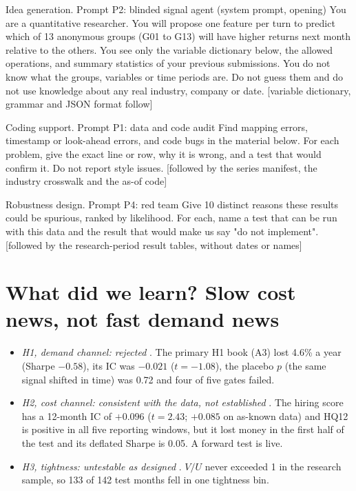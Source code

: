 \begin{promptbox}{Idea generation. Prompt P2: blinded signal agent (system prompt, opening)}
You are a quantitative researcher. You will propose one feature per turn to predict which of 13 anonymous groups (G01 to G13) will have higher returns next month relative to the others. You see only the variable dictionary below, the allowed operations, and summary statistics of your previous submissions. You do not know what the groups, variables or time periods are. Do not guess them and do not use knowledge about any real industry, company or date. [variable dictionary, grammar and JSON format follow]
\end{promptbox}
\begin{promptbox}{Coding support. Prompt P1: data and code audit}
Find mapping errors, timestamp or look-ahead errors, and code bugs in the material below. For each problem, give the exact line or row, why it is wrong, and a test that would confirm it. Do not report style issues. [followed by the series manifest, the industry crosswalk and the as-of code]
\end{promptbox}
\begin{promptbox}{Robustness design. Prompt P4: red team}\label{box:p4}
Give 10 distinct reasons these results could be spurious, ranked by likelihood. For each, name a test that can be run with this data and the result that would make us say "do not implement". [followed by the research-period result tables, without dates or names]
\end{promptbox}

\section{What did we learn? Slow cost news, not fast demand news}

\begin{keybox}
\begin{itemize}[leftmargin=*]
  \item \emph{H1, demand channel: rejected} \tagc. The primary H1 book (A3) lost 4.6\% a year (Sharpe $-0.58$), its IC was $-0.021$ ($t=-1.08$), the placebo $p$ (the same signal shifted in time) was 0.72 and four of five gates failed. %
  \item \emph{H2, cost channel: consistent with the data, not established} \tagp. The hiring score has a 12-month IC of $+0.096$ ($t=2.43$; $+0.085$ on as-known data) and HQ12 is positive in all five reporting windows, but it lost money in the first half of the test and its deflated Sharpe is 0.05. A forward test is live. %
  \item \emph{H3, tightness: untestable as designed} \tagp. $V/U$ never exceeded 1 in the research sample, so 133 of 142 test months fell in one tightness bin. %
\end{itemize}
\end{keybox}

